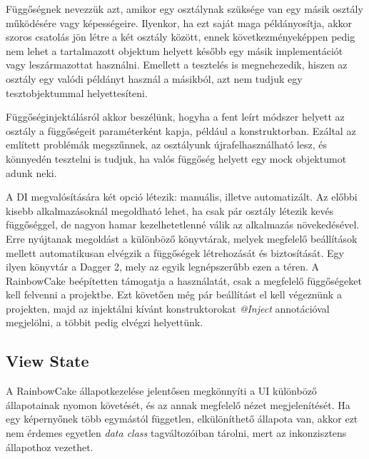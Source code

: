 Függőségnek nevezzük azt, amikor egy osztálynak szüksége van egy másik osztály működésére vagy képességeire. Ilyenkor, ha ezt saját maga példányosítja, akkor szoros csatolás jön létre a két osztály között, ennek következményeképpen pedig nem lehet a tartalmazott objektum helyett később egy másik implementációt vagy leszármazottat használni. Emellett a tesztelés is megnehezedik, hiszen az osztály egy valódi példányt használ a másikból, azt nem tudjuk egy tesztobjektummal helyettesíteni.

Függőséginjektálásról akkor beszélünk, hogyha a fent leírt módszer helyett az osztály a függőségeit paraméterként kapja, például a konstruktorban. Ezáltal az említett problémák megszűnnek, az osztályunk újrafelhasználható lesz, és könnyedén tesztelni is tudjuk, ha valós függőség helyett egy mock objektumot adunk neki. 

A DI megvalósítására két opció létezik: manuális, illetve automatizált. Az előbbi kisebb alkalmazásoknál megoldható lehet, ha csak pár osztály létezik kevés függőséggel, de nagyon hamar kezelhetetlenné válik az alkalmazás növekedésével. Erre nyújtanak megoldást a különböző könyvtárak, melyek megfelelő beállítások mellett automatikusan elvégzik a függőségek létrehozását és biztosítását. 
Egy ilyen könyvtár a Dagger 2, mely az egyik legnépszerűbb ezen a téren. A RainbowCake beépítetten támogatja a használatát, csak a megfelelő függőségeket kell felvenni a projektbe. Ezt követően még pár beállítást el kell végeznünk a projekten, majd az injektálni kívánt konstruktorokat \emph{@Inject} annotációval megjelölni, a többit pedig elvégzi helyettünk.


\subsection{View State}
A RainbowCake állapotkezelése jelentősen megkönnyíti a UI különböző állapotainak nyomon követését, és az annak megfelelő nézet megjelenítését. Ha egy képernyőnek több egymástól független, elkülöníthető állapota van, akkor ezt nem érdemes egyetlen \emph{data class} tagváltozóiban tárolni, mert az inkonzisztens állapothoz vezethet.\cite{ViewState} 

